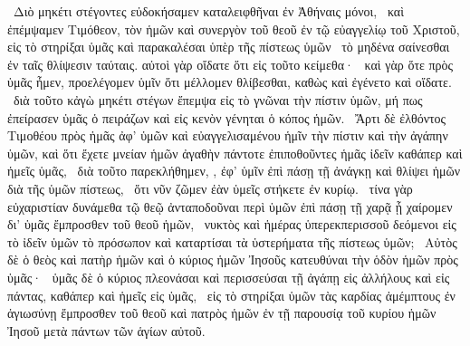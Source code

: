 ~Διὸ μηκέτι στέγοντες εὐδοκήσαμεν καταλειφθῆναι ἐν Ἀθήναις μόνοι,
~καὶ ἐπέμψαμεν Τιμόθεον, τὸν  ἡμῶν καὶ συνεργὸν τοῦ θεοῦ ἐν τῷ εὐαγγελίῳ τοῦ Χριστοῦ, εἰς τὸ στηρίξαι ὑμᾶς καὶ παρακαλέσαι ὑπὲρ τῆς πίστεως ὑμῶν
~τὸ μηδένα σαίνεσθαι ἐν ταῖς θλίψεσιν ταύταις. αὐτοὶ γὰρ οἴδατε ὅτι εἰς τοῦτο κείμεθα·
~καὶ γὰρ ὅτε πρὸς ὑμᾶς ἦμεν, προελέγομεν ὑμῖν ὅτι μέλλομεν θλίβεσθαι, καθὼς καὶ ἐγένετο καὶ οἴδατε.
~διὰ τοῦτο κἀγὼ μηκέτι στέγων ἔπεμψα εἰς τὸ γνῶναι τὴν πίστιν ὑμῶν, μή πως ἐπείρασεν ὑμᾶς ὁ πειράζων καὶ εἰς κενὸν γένηται ὁ κόπος ἡμῶν.
~Ἄρτι δὲ ἐλθόντος Τιμοθέου πρὸς ἡμᾶς ἀφ’ ὑμῶν καὶ εὐαγγελισαμένου ἡμῖν τὴν πίστιν καὶ τὴν ἀγάπην ὑμῶν, καὶ ὅτι ἔχετε μνείαν ἡμῶν ἀγαθὴν πάντοτε ἐπιποθοῦντες ἡμᾶς ἰδεῖν καθάπερ καὶ ἡμεῖς ὑμᾶς,
~διὰ τοῦτο παρεκλήθημεν, , ἐφ’ ὑμῖν ἐπὶ πάσῃ τῇ ἀνάγκῃ καὶ θλίψει ἡμῶν διὰ τῆς ὑμῶν πίστεως,
~ὅτι νῦν ζῶμεν ἐὰν ὑμεῖς στήκετε ἐν κυρίῳ.
~τίνα γὰρ εὐχαριστίαν δυνάμεθα τῷ θεῷ ἀνταποδοῦναι περὶ ὑμῶν ἐπὶ πάσῃ τῇ χαρᾷ ᾗ χαίρομεν δι’ ὑμᾶς ἔμπροσθεν τοῦ θεοῦ ἡμῶν,
~νυκτὸς καὶ ἡμέρας ὑπερεκπερισσοῦ δεόμενοι εἰς τὸ ἰδεῖν ὑμῶν τὸ πρόσωπον καὶ καταρτίσαι τὰ ὑστερήματα τῆς πίστεως ὑμῶν;
~Αὐτὸς δὲ ὁ θεὸς καὶ πατὴρ ἡμῶν καὶ ὁ κύριος ἡμῶν Ἰησοῦς κατευθύναι τὴν ὁδὸν ἡμῶν πρὸς ὑμᾶς·
~ὑμᾶς δὲ ὁ κύριος πλεονάσαι καὶ περισσεύσαι τῇ ἀγάπῃ εἰς ἀλλήλους καὶ εἰς πάντας, καθάπερ καὶ ἡμεῖς εἰς ὑμᾶς,
~εἰς τὸ στηρίξαι ὑμῶν τὰς καρδίας ἀμέμπτους ἐν ἁγιωσύνῃ ἔμπροσθεν τοῦ θεοῦ καὶ πατρὸς ἡμῶν ἐν τῇ παρουσίᾳ τοῦ κυρίου ἡμῶν Ἰησοῦ μετὰ πάντων τῶν ἁγίων αὐτοῦ.

